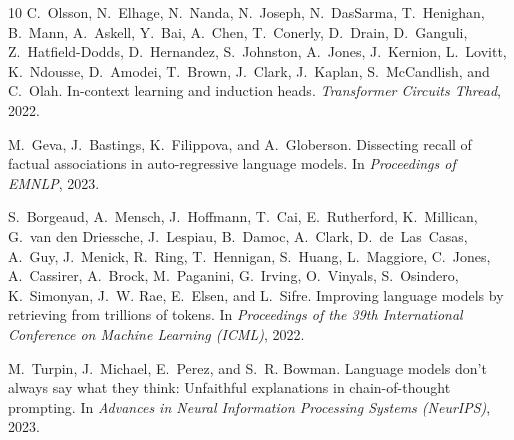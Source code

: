 \documentclass[11pt]{article}
\begin{document}
\begin{thebibliography}{10}
C.~Olsson, N.~Elhage, N.~Nanda, N.~Joseph, N.~DasSarma, T.~Henighan, B.~Mann, A.~Askell, Y.~Bai, A.~Chen, T.~Conerly, D.~Drain, D.~Ganguli, Z.~Hatfield-Dodds, D.~Hernandez, S.~Johnston, A.~Jones, J.~Kernion, L.~Lovitt, K.~Ndousse, D.~Amodei, T.~Brown, J.~Clark, J.~Kaplan, S.~McCandlish, and C.~Olah.
\newblock In-context learning and induction heads.
\newblock \emph{Transformer Circuits Thread}, 2022.

M.~Geva, J.~Bastings, K.~Filippova, and A.~Globerson.
\newblock Dissecting recall of factual associations in auto-regressive language models.
\newblock In \emph{Proceedings of EMNLP}, 2023.

S.~Borgeaud, A.~Mensch, J.~Hoffmann, T.~Cai, E.~Rutherford, K.~Millican, G.~van den Driessche, J.~Lespiau, B.~Damoc, A.~Clark, D.~de~Las~Casas, A.~Guy, J.~Menick, R.~Ring, T.~Hennigan, S.~Huang, L.~Maggiore, C.~Jones, A.~Cassirer, A.~Brock, M.~Paganini, G.~Irving, O.~Vinyals, S.~Osindero, K.~Simonyan, J.~W. Rae, E.~Elsen, and L.~Sifre.
\newblock Improving language models by retrieving from trillions of tokens.
\newblock In \emph{Proceedings of the 39th International Conference on Machine Learning (ICML)}, 2022.

M.~Turpin, J.~Michael, E.~Perez, and S.~R. Bowman.
\newblock Language models don't always say what they think: Unfaithful explanations in chain-of-thought prompting.
\newblock In \emph{Advances in Neural Information Processing Systems (NeurIPS)}, 2023.

\end{thebibliography}
\end{document}
